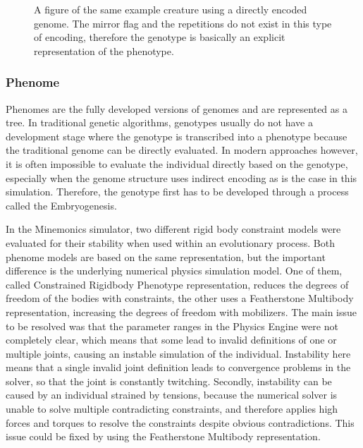 \documentclass[main]{subfiles}
\begin{document}
\begin{figure}[H]
\centering


\caption[Directly encoded genome]{A figure of the same example creature using a directly encoded genome. The mirror flag and the repetitions do not exist in this type of encoding, therefore the genotype is basically an explicit representation of the phenotype.}
\label{figure:direct-encoding}
\end{figure}

\subsubsection{Phenome}

Phenomes are the fully developed versions of genomes and are represented as a tree. %
%
In traditional genetic algorithms, genotypes usually do not have a development stage where the genotype is transcribed into a phenotype because the traditional genome can be directly evaluated. %
%
In modern approaches however, it is often impossible to evaluate the individual directly based on the genotype, especially when the genome structure uses indirect encoding as is the case in this simulation. %
%
Therefore, the genotype first has to be developed through a process called the Embryogenesis.

In the Minemonics simulator, two different rigid body constraint models were evaluated for their stability when used within an evolutionary process. %
%
Both phenome models are based on the same representation, but the important difference is the underlying numerical physics simulation model. %
%
One of them, called Constrained Rigidbody Phenotype representation, reduces the degrees of freedom of the bodies with constraints, the other uses a Featherstone Multibody representation, increasing the degrees of freedom with mobilizers. %
%
The main issue to be resolved was that the parameter ranges in the Physics Engine were not completely clear, which means that some lead to invalid definitions of one or multiple joints, causing an instable simulation of the individual. %
%
Instability here means that a single invalid joint definition leads to convergence problems in the solver, so that the joint is constantly twitching. %
%
Secondly, instability can be caused by an individual strained by tensions, because the numerical solver is unable to solve multiple contradicting constraints, and therefore applies high forces and torques to resolve the constraints despite obvious contradictions. %
%
This issue could be fixed by using the Featherstone Multibody representation. 
\end{document}
